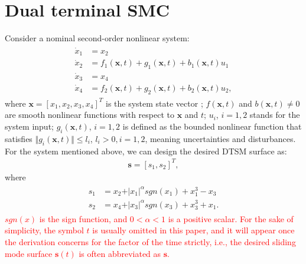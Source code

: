 \documentclass[3p]{elsarticle}
\theoremstyle{plain}
\theoremstyle{remark}
\begin{document}
\section{Dual terminal SMC}\label{sec:2}
Consider a nominal second-order nonlinear system:
\begin{align}
\begin{split}
\dot x_1 &= x_2\\
\dot x_2 &= f_1(\bm x,t)+g_1(\bm x,t)+b_1(\bm x,t)u_1\\
\dot x_3 &= x_4\\
\dot x_4 &= f_2(\bm x,t)+g_2(\bm x,t)+b_2(\bm x,t)u_2,\label{eq:second-order system}
\end{split}
\end{align}
where $\bm x = [x_1,x_2,x_3,x_4]^T$ is the system state vector ; $f(\bm x,t)$ and $b(\bm x,t)\neq 0$ are smooth nonlinear functions with respect to $\bm x$ and $t$; $u_i$, $i=1,2$ stands for the system input; $g_i(\bm x,t)$, $i=1,2$  is defined as the bounded nonlinear function that satisfies $\Vert g_i(\bm x,t)\Vert\le l_i$, $l_i>0, i=1,2$, meaning uncertainties and disturbances. For the system mentioned above, we can design the desired DTSM surface as:
\begin{align}
\bm s = [s_1,s_2]^T,
\end{align}
where
\begin{align}
\begin{split}
s_1 &= x_2+\vert x_1\vert^{\alpha} sgn(x_1)+x_1^3-x_3\\
s_2 &= x_4+\vert x_3\vert^{\alpha} sgn(x_3)+x_3^3+x_1.\label{eq:dual sliding mode  surface}
\end{split}
\end{align}
\textcolor{red}{$sgn(x)$ is the sign function, and $0<\alpha<1$ is a positive scalar. For the sake of simplicity, the symbol $t$ is usually omitted in this paper, and it will appear once the derivation concerns for the factor of the time strictly, i.e., the desired sliding mode  surface $\bm s(t)$ is often abbreviated as $\bm s$.}
\end{document}
